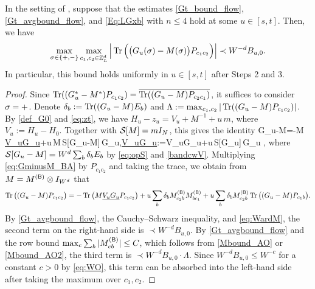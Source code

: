 \begin{lemma}\label{lem:TL1_BA}
In the setting of , suppose that the estimates \eqref{Gt_bound_flow}, \eqref{Gt_avgbound_flow}, and \eqref{Eq:LGxb} with $n\le 4$ hold at some $u\in[s,t]$. Then, we have
\[ \max_{\sig\in\{+,-\}}\max_{c_1,c_2\in\Zn}\Big|\tr\Big(\big(G_u(\sig)-M(\sig)\big)P_{c_1c_2}\Big)\Big|\prec W^{-d}B_{u,0} . \]
In particular, this bound holds uniformly in $u\in[s,t]$ after Steps 2 and 3.
\end{lemma}
\begin{proof}
Since $\tr((G_u^*-M^*)P_{c_1c_2})=\overline{\tr((G_u-M)P_{c_2c_1})}$, it suffices to consider $\sig=+$. Denote $\delta_b:=\tr((G_u-M)E_b)$ and $\Lambda:=\max_{c_1,c_2}|\tr((G_u-M)P_{c_1c_2})|$. By \eqref{def_G0} and \eqref{eq:zt}, we have $H_u-z_u=V_u+M^{-1}+u\,m$, where $V_u:=H_u-H_0$. Together with $\cal S[M]=mI_N$, this gives the identity
\be\label{eq:GminusM_BA}
G_u-M=-M\,\underline{V_uG_u}+u\,M\,\cal S[G_u-M]\,G_u,\qquad \underline{V_uG_u}:=V_uG_u+u\,\cal S[G_u]\,G_u ,
\ee
where $\cal S[G_u-M]=W^d\sum_b\delta_bE_b$ by \eqref{eq:opS} and \eqref{bandcwV}. Multiplying \eqref{eq:GminusM_BA} by $P_{c_1c_2}$ and taking the trace, we obtain from $M=M^{(\sB)}\otimes I_{W^d}$ that
\[ \tr\big((G_u-M)P_{c_1c_2}\big)=-\tr\big(M\underline{V_uG_u}P_{c_1c_2}\big)+u\sum_b\delta_bM^{(\sB)}_{c_2b}M^{(\sB)}_{bc_1}+u\sum_b\delta_bM^{(\sB)}_{c_2b}\tr\big((G_u-M)P_{c_1b}\big). \]
By \eqref{Gt_avgbound_flow}, the Cauchy--Schwarz inequality, and \eqref{eq:WardM}, the second term on the right-hand side is $\prec W^{-d}B_{u,0}$. By \eqref{Gt_avgbound_flow} and the row bound $\max_c\sum_b|M^{(\sB)}_{cb}|\le C$, which follows from \eqref{Mbound_AO} or \eqref{Mbound_AO2}, the third term is $\prec W^{-d}B_{u,0}\cdot\Lambda$. Since $W^{-d}B_{u,0}\le W^{-c}$ for a constant $c>0$ by \eqref{eq:WO}, this term can be absorbed into the left-hand side after taking the maximum over $c_1,c_2$.


\end{proof}
